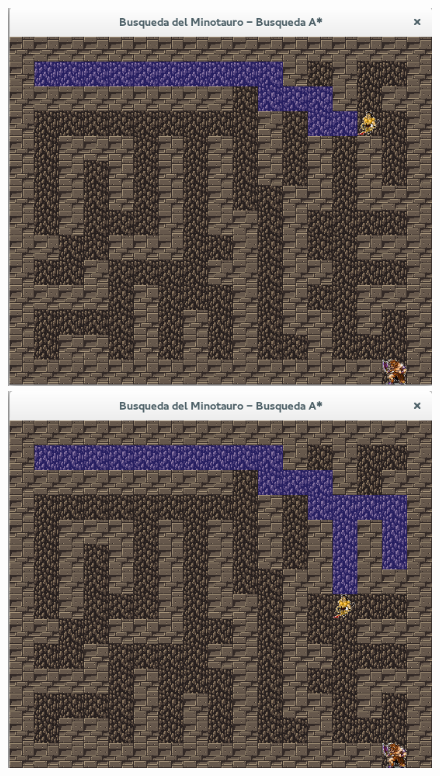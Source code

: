 \documentclass[letter, titlepage, 10pt]{article}
\begin{document}
\begin{appendices}
        \begin{figure}[H]
  \centering
    \begin{minipage}{.5\textwidth}
        \centering
        \includegraphics[width=0.8\linewidth]{images/bae_01}
    \end{minipage}%
    \begin{minipage}{.5\textwidth}
        \centering
        \includegraphics[width=0.8\linewidth]{images/bae_02}
    \end{minipage}
\end{figure}


\end{appendices}
\end{document}
